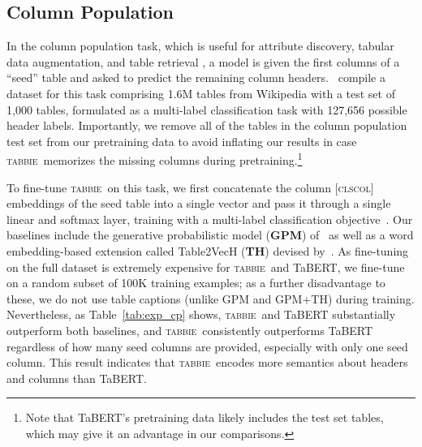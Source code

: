 \documentclass[11pt]{article}
\newcommand{\name}[0]{\textsc{tabbie}}
\begin{document}
\subsection{Column Population}
In the column population task, which is useful for attribute discovery, tabular data augmentation, and table retrieval \cite{dassarma-finding}, a model is given the first  columns of a ``seed'' table and asked to predict the remaining column headers.~\citet{entitables} compile a dataset for this task comprising 1.6M tables from Wikipedia with a test set of 1,000 tables, formulated as a multi-label classification task with 127,656 possible header labels. Importantly, we remove all of the tables in the column population test set from our pretraining data to avoid inflating our results in case \name\ memorizes the missing columns during pretraining.\footnote{Note that TaBERT's pretraining data likely includes the test set tables, which may give it an advantage in our comparisons.} 

To fine-tune \name\ on this task, we first concatenate the column \textsc{[clscol]} embeddings of the seed table into a single vector and pass it through a single linear and softmax layer, training with a multi-label classification objective~\cite{Mahajan2018ExploringTL}. Our baselines include the generative probabilistic model (\textbf{GPM}) of~\citet{entitables} as well as a word embedding-based extension called Table2VecH (\textbf{TH}) devised by~\citet{Zhang:2018:AHT}. As fine-tuning on the full dataset is extremely expensive for \name\ and TaBERT, we fine-tune on a random subset of 100K training examples; as a further disadvantage to these, we do not use table captions (unlike GPM and GPM+TH) during training. Nevertheless, as Table~\ref{tab:exp_cp} shows, \name\ and TaBERT substantially outperform both baselines, and \name\ consistently outperforms TaBERT regardless of how many seed columns are provided, especially with only one seed column. This result indicates that \name\ encodes more semantics about headers and columns than TaBERT. 
\end{document}
